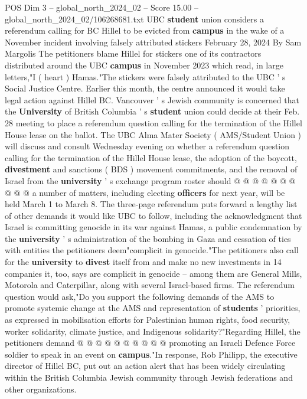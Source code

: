 \begin{textsample}{POS Dim 3 – global\_north\_2024\_02 – Score 15.00 – global\_north\_2024\_02/106268681.txt}  \label{ex:f3_pos_248}
UBC \textbf{student} union considers a referendum calling for BC Hillel to be evicted from \textbf{campus} in the wake of a November incident involving falsely attributed stickers February 28, 2024 By Sam Margolis The petitioners blame Hillel for stickers one of its contractors distributed around the UBC \textbf{campus} in November 2023 which read, in large letters,"I ( heart ) Hamas."The stickers were falsely attributed to the UBC ' s Social Justice Centre.
Earlier this month, the centre announced it would take legal action against Hillel BC.
Vancouver ' s Jewish community is concerned that the \textbf{University} of British Columbia ' s \textbf{student} union could decide at their Feb. 28 meeting to place a referendum question calling for the termination of the Hillel House lease on the ballot.
The UBC Alma Mater Society ( AMS/Student Union ) will discuss and consult Wednesday evening on whether a referendum question calling for the termination of the Hillel House lease, the adoption of the boycott, \textbf{divestment} and sanctions ( BDS ) movement commitments, and the removal of Israel from the \textbf{university} ' s exchange program roster should @ @ @ @ @ @ @ @ @ @ a number of matters, including electing \textbf{officers} for next year, will be held March 1 to March 8.
The three-page referendum puts forward a lengthy list of other demands it would like UBC to follow, including the acknowledgment that Israel is committing genocide in its war against Hamas, a public condemnation by the \textbf{university} ' s administration of the bombing in Gaza and cessation of ties with entities the petitioners deem"complicit in genocide."The petitioners also call for the \textbf{university} to \textbf{divest} itself from and make no new investments in 14 companies it, too, says are complicit in genocide -- among them are General Mills, Motorola and Caterpillar, along with several Israel-based firms.
The referendum question would ask,"Do you support the following demands of the AMS to promote systemic change at the AMS and representation of \textbf{students} ' priorities, as expressed in mobilisation efforts for Palestinian human rights, food security, worker solidarity, climate justice, and Indigenous solidarity?"Regarding Hillel, the petitioners demand @ @ @ @ @ @ @ @ @ @ promoting an Israeli Defence Force soldier to speak in an event on \textbf{campus}."In response, Rob Philipp, the executive director of Hillel BC, put out an action alert that has been widely circulating within the British Columbia Jewish community through Jewish federations and other organizations.

\end{textsample}
